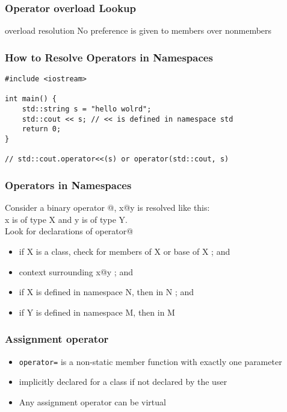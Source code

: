\documentclass{beamer}
\begin{document}
\begin{frame}[fragile]
\frametitle{Operator overload Lookup}

\begin{block}{overload resolution}
No preference is given to members over nonmembers
\end{block}

\end{frame}

\begin{frame}[fragile]
\frametitle{How to Resolve Operators in Namespaces}
\begin{example}
\begin{lstlisting}
#include <iostream>

int main() {
    std::string s = "hello wolrd";
    std::cout << s; // << is defined in namespace std
    return 0;
}

// std::cout.operator<<(s) or operator(std::cout, s)

\end{lstlisting}
\end{example}


\end{frame}

\begin{frame}[fragile]
\frametitle{Operators in Namespaces}
Consider a binary operator @, x@y is resolved like this: \\
x is of type X and y is of type Y.  \\
Look for declarations of operator@
\begin{itemize}
\item if X is a class, check for members of X or base of X ; and
\item context surrounding x@y ; and
\item if X is defined in namespace N, then in N ; and
\item if Y is defined in namespace M, then in M 
\end{itemize}

\end{frame}



\begin{frame}[fragile]
\frametitle{Assignment operator}
\begin{itemize}
\item \texttt{operator=} is a non-static member function with exactly one parameter
\item implicitly declared for a class if not declared by the user
\item Any assignment operator can be virtual
\end{itemize}

\end{frame}
\end{document}
